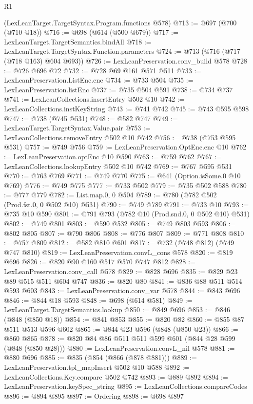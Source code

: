 \begin{lexlean}{R1}
\begin{coremodule}
{{{{{{{{{{{{{{{{{{{{    (LexLeanTarget.TargetSyntax.Program.functions @578)
@713 := @697 (@700 (@710 @18))
@716 := @698 (@614 (@500 @679))
@717 := LexLeanTarget.TargetSemantics.bindAll
@718 := LexLeanTarget.TargetSyntax.Function.parameters
@724 := @713 (@716 (@717 (@718 @163) @604 @693))
@726 := LexLeanPreservation.conv_build @578
@728 := @726 @696 @72
@732 := @728 @69 @161 @571 @511
@733 := LexLeanPreservation.ListEnc.enc
@734 := @733 @504
@735 := LexLeanPreservation.listEnc
@737 := @735 @504 @591
@738 := @734 @737
@741 := LexLeanCollections.insertEntry @502 @10
@742 := LexLeanCollections.instKeyString
@743 := @741 @742
@745 := @743 @595 @598
@747 := @738 (@745 @531)
@748 := @582 @747
@749 := LexLeanTarget.TargetSyntax.Value.pair
@753 := LexLeanCollections.removeEntry @502 @10 @742
@756 := @738 (@753 @595 @531)
@757 := @749 @756
@759 := LexLeanPreservation.OptEnc.enc @10
@762 := LexLeanPreservation.optEnc @10 @590
@763 := @759 @762
@767 := LexLeanCollections.lookupEntry @502 @10 @742
@769 := @767 @595 @531
@770 := @763 @769
@771 := @749 @770
@775 := @641 (Option.isSome.{0} @10 @769)
@776 := @749 @775
@777 := @733 @502
@779 := @735 @502 @588
@780 := @777 @779
@782 := List.map.{0, 0} @504
@789 := @780 (@782 @502 (Prod.fst.{0, 0} @502 @10) @531)
@790 := @749 @789
@791 := @733 @10
@793 := @735 @10 @590
@801 := @791 @793 (@782 @10 (Prod.snd.{0, 0} @502 @10) @531)
@802 := @749 @801
@803 := @590 @532
@805 := @749 @803 @593
@806 := @802 @805
@807 := @790 @806
@808 := @776 @807
@809 := @771 @808
@810 := @757 @809
@812 := @582 @810 @601
@817 := @732 (@748 @812) (@749 @747 @810)
@819 := LexLeanPreservation.convL_cons @578
@820 := @819 @696
@826 := @820 @90 @160 @517 @570 @747 @812
@828 := LexLeanPreservation.conv_call @578
@829 := @828 @696
@835 := @829 @23 @89 @515 @511 @604 @747
@836 := @820 @80
@841 := @836 @88 @511 @514 @593 @603
@843 := LexLeanPreservation.conv_var @578
@844 := @843 @696
@846 := @844 @18 @593
@848 := @698 (@614 @581)
@849 := LexLeanTarget.TargetSemantics.lookup
@850 := @849 @696
@853 := @846 (@848 (@850 @18))
@854 := @841 @853
@855 := @820 @82
@860 := @855 @87 @511 @513 @596 @602
@865 := @844 @23 @596 (@848 (@850 @23))
@866 := @860 @865
@878 := @820 @84 @86 @511 @511 @599 @601 (@844 @28 @599 (@848 (@850 @28)))
@880 := LexLeanPreservation.convL_nil @578
@881 := @880 @696
@885 := @835 (@854 (@866 (@878 @881)))
@889 := LexLeanPreservation.tpl_mapInsert @502 @10 @588
@892 := LexLeanCollections.Key.compare @502 @742
@893 := @889 @892
@894 := LexLeanPreservation.keySpec_string
@895 := LexLeanCollections.compareCodes
@896 := @894 @895
@897 := Ordering
@898 := @698 @897
}}}}}}}}}}}}}}}}}}}}
\end{coremodule}
\end{lexlean}
